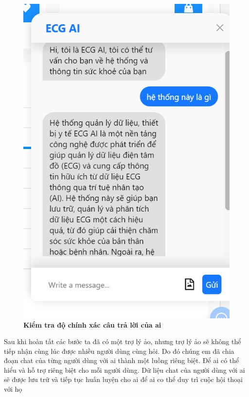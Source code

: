 \begin{figure}[H]
  \centering
  \includegraphics[scale=0.5]{Images/server/ai/check-ai.png}
  \caption[Kiểm tra độ chính xác câu trả lời của ai]{\bfseries \fontsize{12pt}{0pt}
  \selectfont Kiểm tra độ chính xác câu trả lời của ai}
  \label{check-ai} %
\end{figure}

Sau khi hoàn tất các bước ta đã có một trợ lý ảo, nhưng trợ lý ảo sẽ không thể tiếp nhận cùng lúc được nhiều người dùng cùng hỏi. Do đó chúng em đã chia đoạn chat của từng người dùng với ai thành một luồng riêng biệt. Để ai có thể hiểu và hỗ trợ riêng biệt cho mỗi người dùng. Dữ liệu chat của người dùng với ai sẽ được lưu trữ và tiếp tục huấn luyện cho ai để ai co thể duy trì cuộc hội thoại với họ 

